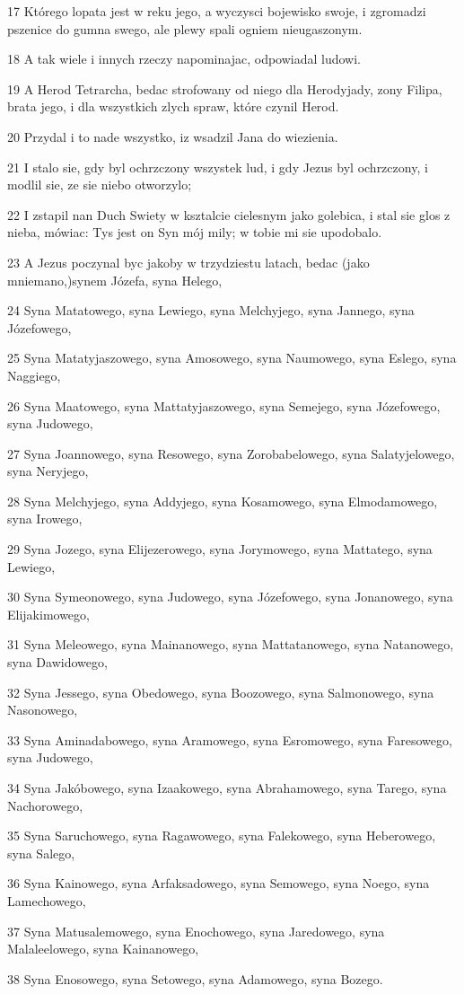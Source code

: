 \par 17 Którego lopata jest w reku jego, a wyczysci bojewisko swoje, i zgromadzi pszenice do gumna swego, ale plewy spali ogniem nieugaszonym.
\par 18 A tak wiele i innych rzeczy napominajac, odpowiadal ludowi.
\par 19 A Herod Tetrarcha, bedac strofowany od niego dla Herodyjady, zony Filipa, brata jego, i dla wszystkich zlych spraw, które czynil Herod.
\par 20 Przydal i to nade wszystko, iz wsadzil Jana do wiezienia.
\par 21 I stalo sie, gdy byl ochrzczony wszystek lud, i gdy Jezus byl ochrzczony, i modlil sie, ze sie niebo otworzylo;
\par 22 I zstapil nan Duch Swiety w ksztalcie cielesnym jako golebica, i stal sie glos z nieba, mówiac: Tys jest on Syn mój mily; w tobie mi sie upodobalo.
\par 23 A Jezus poczynal byc jakoby w trzydziestu latach, bedac (jako mniemano,)synem Józefa, syna Helego,
\par 24 Syna Matatowego, syna Lewiego, syna Melchyjego, syna Jannego, syna Józefowego,
\par 25 Syna Matatyjaszowego, syna Amosowego, syna Naumowego, syna Eslego, syna Naggiego,
\par 26 Syna Maatowego, syna Mattatyjaszowego, syna Semejego, syna Józefowego, syna Judowego,
\par 27 Syna Joannowego, syna Resowego, syna Zorobabelowego, syna Salatyjelowego, syna Neryjego,
\par 28 Syna Melchyjego, syna Addyjego, syna Kosamowego, syna Elmodamowego, syna Irowego,
\par 29 Syna Jozego, syna Elijezerowego, syna Jorymowego, syna Mattatego, syna Lewiego,
\par 30 Syna Symeonowego, syna Judowego, syna Józefowego, syna Jonanowego, syna Elijakimowego,
\par 31 Syna Meleowego, syna Mainanowego, syna Mattatanowego, syna Natanowego, syna Dawidowego,
\par 32 Syna Jessego, syna Obedowego, syna Boozowego, syna Salmonowego, syna Nasonowego,
\par 33 Syna Aminadabowego, syna Aramowego, syna Esromowego, syna Faresowego, syna Judowego,
\par 34 Syna Jakóbowego, syna Izaakowego, syna Abrahamowego, syna Tarego, syna Nachorowego,
\par 35 Syna Saruchowego, syna Ragawowego, syna Falekowego, syna Heberowego, syna Salego,
\par 36 Syna Kainowego, syna Arfaksadowego, syna Semowego, syna Noego, syna Lamechowego,
\par 37 Syna Matusalemowego, syna Enochowego, syna Jaredowego, syna Malaleelowego, syna Kainanowego,
\par 38 Syna Enosowego, syna Setowego, syna Adamowego, syna Bozego.

